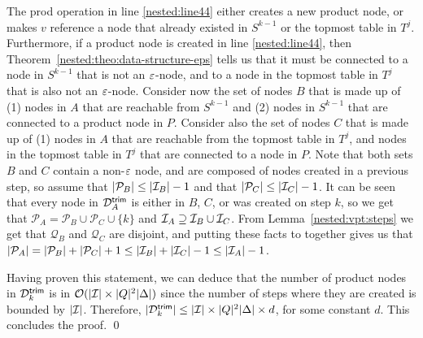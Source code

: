 The \textsf{prod} operation in line \ref{nested:line44} either creates a new product node, or makes $v$ reference a node that already existed in $S^{k-1}$ or the topmost table in $T^j$. 
Furthermore, if a product node is created in line \ref{nested:line44}, then Theorem~\ref{nested:theo:data-structure-eps} tells us that it must be connected to a node in $S^{k-1}$ that is not an $\varepsilon$-node, and to a node in the topmost table in $T^j$ that is also not an $\varepsilon$-node. Consider now the set of nodes $B$ that is made up of (1) nodes in $A$ that are reachable from $S^{k-1}$ and (2) nodes in $S^{k-1}$ that are connected to a product node in $P$. Consider also the set of nodes $C$ that is made up of (1) nodes in $A$ that are reachable from the topmost table in $T^j$, and nodes in the topmost table in $T^j$ that are connected to a node in $P$. Note that both sets $B$ and $C$ contain a non-$\varepsilon$ node, and are composed of nodes created in a previous step, so assume that $|{\mathcal P}_B| \leq |\mathcal{I}_B| -1$ and that $|{\mathcal P}_C| \leq |\mathcal{I}_C| -1$. It can be seen that every node in $\mathcal{D}^{\textsf{trim}}_A$ is either in $B$, $C$, or was created on step $k$, so we get that ${\mathcal P}_A = {\mathcal P}_B \cup {\mathcal P}_C \cup \{k\}$ and $\mathcal{I}_A \supseteq \mathcal{I}_B \cup \mathcal{I}_C$. From Lemma~\ref{nested:vpt:steps} we get that ${\mathcal Q}_B$ and ${\mathcal Q}_C$ are disjoint, and putting these facts to together gives us that $| {\mathcal P}_A | =  |{\mathcal P}_B| + |{\mathcal P}_C| + 1\leq |\mathcal{I}_B| + |\mathcal{I}_C| - 1 \leq |\mathcal{I}_A|-1$.

Having proven this statement, we can deduce that the number of product nodes in $\mathcal{D}^{\textsf{trim}}_k$ is in $\mathcal{O}(| \mathcal{I} | \times |Q|^2|\Delta|)$ since the number of steps where they are created is bounded by $|\mathcal{I}|$. Therefore, $| \mathcal{D}^{\textsf{trim}}_k | \leq | \mathcal{I} | \times |Q|^2|\Delta| \times d$, for some constant $d$. This concludes the proof. \hfill \qed